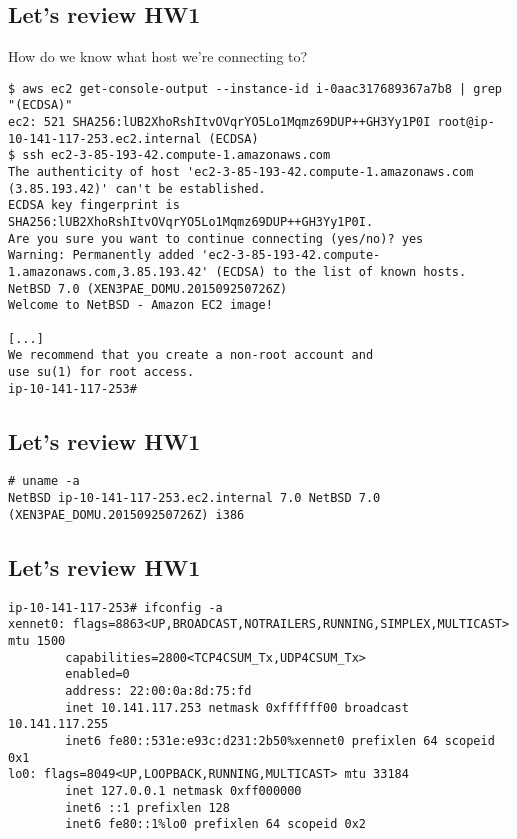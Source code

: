 \documentclass[xga]{xdvislides}
\begin{document}
\subsection{Let's review HW1}
How do we know what host we're connecting to?
\begin{verbatim}
$ aws ec2 get-console-output --instance-id i-0aac317689367a7b8 | grep "(ECDSA)"
ec2: 521 SHA256:lUB2XhoRshItvOVqrYO5Lo1Mqmz69DUP++GH3Yy1P0I root@ip-10-141-117-253.ec2.internal (ECDSA)
$ ssh ec2-3-85-193-42.compute-1.amazonaws.com
The authenticity of host 'ec2-3-85-193-42.compute-1.amazonaws.com
(3.85.193.42)' can't be established.
ECDSA key fingerprint is SHA256:lUB2XhoRshItvOVqrYO5Lo1Mqmz69DUP++GH3Yy1P0I.
Are you sure you want to continue connecting (yes/no)? yes
Warning: Permanently added 'ec2-3-85-193-42.compute-1.amazonaws.com,3.85.193.42' (ECDSA) to the list of known hosts.
NetBSD 7.0 (XEN3PAE_DOMU.201509250726Z)
Welcome to NetBSD - Amazon EC2 image!

[...]
We recommend that you create a non-root account and
use su(1) for root access.
ip-10-141-117-253#

\end{verbatim}

\subsection{Let's review HW1}
\begin{verbatim}
# uname -a
NetBSD ip-10-141-117-253.ec2.internal 7.0 NetBSD 7.0 (XEN3PAE_DOMU.201509250726Z) i386
\end{verbatim}

\subsection{Let's review HW1}
\begin{verbatim}
ip-10-141-117-253# ifconfig -a
xennet0: flags=8863<UP,BROADCAST,NOTRAILERS,RUNNING,SIMPLEX,MULTICAST> mtu 1500
        capabilities=2800<TCP4CSUM_Tx,UDP4CSUM_Tx>
        enabled=0
        address: 22:00:0a:8d:75:fd
        inet 10.141.117.253 netmask 0xffffff00 broadcast 10.141.117.255
        inet6 fe80::531e:e93c:d231:2b50%xennet0 prefixlen 64 scopeid 0x1
lo0: flags=8049<UP,LOOPBACK,RUNNING,MULTICAST> mtu 33184
        inet 127.0.0.1 netmask 0xff000000
        inet6 ::1 prefixlen 128
        inet6 fe80::1%lo0 prefixlen 64 scopeid 0x2
\end{verbatim}
\end{document}
